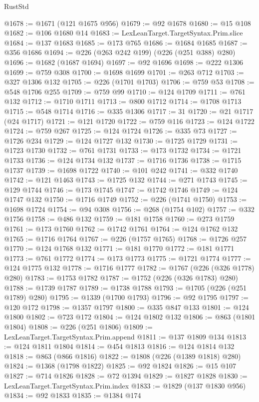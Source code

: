 \begin{lexlean}{RustStd}
\begin{coremodule}
@1678 := @1671 (@121 @1675 @956)
@1679 := @92 @1678
@1680 := @15 @108
@1682 := @106 @1680 @14
@1683 := LexLeanTarget.TargetSyntax.Prim.slice
@1684 := @137 @1683
@1685 := @173 @765
@1686 := @1684 @1685
@1687 := @356 @1686
@1694 := @226 (@263 @242 @199) (@226 (@251 @388) @280)
@1696 := @1682 (@1687 @1694)
@1697 := @92 @1696
@1698 := @222 @1306
@1699 := @759 @308
@1700 := @1698 @1699
@1701 := @263 @712
@1703 := @327 @1306 @132
@1705 := @226 (@1701 @1703)
@1706 := @759 @53
@1708 := @548 @1706 @255
@1709 := @759 @99
@1710 := @124 @1709
@1711 := @761 @132
@1712 := @1710 @1711
@1713 := @800 @1712
@1714 := @1708 @1713
@1715 := @548 @1714
@1716 := @335 @1306
@1717 := 31
@1720 := @21 @1717 (@24 @1717)
@1721 := @121 @1720
@1722 := @759 @116
@1723 := @124 @1722
@1724 := @759 @267
@1725 := @124 @1724
@1726 := @335 @73
@1727 := @1726 @234
@1729 := @124 @1727 @132
@1730 := @1725 @1729
@1731 := @1723 @1730
@1732 := @761 @1731
@1733 := @173 @1732
@1734 := @1721 @1733
@1736 := @124 @1734 @132
@1737 := @1716 @1736
@1738 := @1715 @1737
@1739 := @1698 @1722
@1740 := @101 @242
@1741 := @332 @1740
@1742 := @121 @1463
@1743 := @1725 @132
@1744 := @271 @1743
@1745 := @129 @1744
@1746 := @173 @1745
@1747 := @1742 @1746
@1749 := @124 @1747 @132
@1750 := @1716 @1749
@1752 := @226 (@1741 @1750)
@1753 := @1698 @1724
@1754 := @94 @308
@1756 := @268 (@1754 @102)
@1757 := @332 @1756
@1758 := @486 @132
@1759 := @181 @1758
@1760 := @273 @1759
@1761 := @173 @1760
@1762 := @1742 @1761
@1764 := @124 @1762 @132
@1765 := @1716 @1764
@1767 := @226 (@1757 @1765)
@1768 := @1726 @257
@1770 := @124 @1768 @132
@1771 := @181 @1770
@1772 := @181 @1771
@1773 := @761 @1772
@1774 := @173 @1773
@1775 := @1721 @1774
@1777 := @124 @1775 @132
@1778 := @1716 @1777
@1782 := @1767 (@226 (@326 @1778) @280)
@1783 := @1753 @1782
@1787 := @1752 (@226 (@326 @1783) @280)
@1788 := @1739 @1787
@1789 := @1738 @1788
@1793 := @1705 (@226 (@251 @1789) @280)
@1795 := @1339 (@1700 @1793)
@1796 := @92 @1795
@1797 := @120 @172
@1798 := @1357 @1797
@1800 := @335 @847 @133
@1801 := @124 @1800
@1802 := @723 @172
@1804 := @124 @1802 @132
@1806 := @863 (@1801 @1804)
@1808 := @226 (@251 @1806)
@1809 := LexLeanTarget.TargetSyntax.Prim.append
@1811 := @137 @1809 @134
@1813 := @124 @1811 @1804
@1814 := @454 @1813
@1816 := @124 @1814 @132
@1818 := @863 (@866 @1816)
@1822 := @1808 (@226 (@1389 @1818) @280)
@1824 := @1368 (@1798 @1822)
@1825 := @92 @1824
@1826 := @15 @107
@1827 := @714 @1826
@1828 := @72 @1394
@1829 := @1827 @1828
@1830 := LexLeanTarget.TargetSyntax.Prim.index
@1833 := @1829 (@137 @1830 @956)
@1834 := @92 @1833
@1835 := @1384 @174

\end{coremodule}
\end{lexlean}
